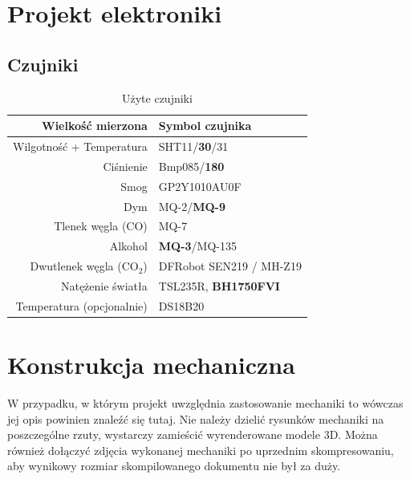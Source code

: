 \documentclass[10pt, a4paper]{article}
\begin{document}
\section{Projekt elektroniki}
	\subsection{Czujniki}
	\begin{table}[H]
		\centering
		\begin{tabular}{|r|l|} \hline
			\textbf{Wielkość mierzona} & \textbf{Symbol czujnika} \\
			\hline
			Wilgotność + Temperatura & SHT11/\textbf{30}/31 \\
			Ciśnienie & Bmp085/\textbf{180} \\
			Smog & GP2Y1010AU0F \\
			Dym & MQ-2/\textbf{MQ-9} \\
			Tlenek węgla (CO) & MQ-7 \\
			Alkohol & \textbf{MQ-3}/MQ-135 \\
			Dwutlenek węgla (CO$_2$) & DFRobot SEN219 / MH-Z19 \\
			Natężenie światła & TSL235R, \textbf{BH1750FVI} \\ \hline
			Temperatura (opcjonalnie) &	DS18B20 \\ \hline
		\end{tabular}
		\caption{Użyte czujniki}
		\label{tab:Czujniki}
	\end{table}

\section{Konstrukcja mechaniczna}

W przypadku, w którym projekt uwzględnia zastosowanie 
mechaniki to wówczas jej opis powinien znaleźć się tutaj.
Nie należy dzielić rysunków mechaniki na poszczególne rzuty, 
wystarczy zamieścić wyrenderowane modele 3D.
Można również dołączyć zdjęcia wykonanej 
mechaniki po uprzednim skompresowaniu, aby wynikowy rozmiar 
skompilowanego dokumentu nie był za duży.
\end{document}
